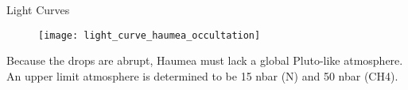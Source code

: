 \begin{frame}[c]{Light Curves}
\scriptsize
\justifying 
\vspace{-0.2 cm}
	\begin{figure}[tb]
		\centering
		\texttt{[image: light\_curve\_haumea\_occultation]}
	\end{figure}
\vspace{-0.2 cm}
\begin{block}{}
Because the drops are abrupt, Haumea must lack a global Pluto-like atmosphere. An upper limit atmosphere is determined to be 15 nbar (N) and 50 nbar (CH4).
\end{block}





\end{frame}

